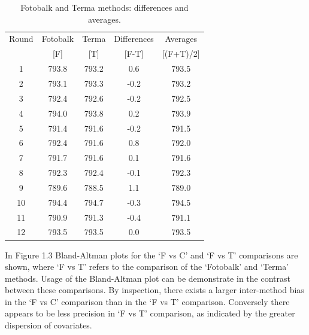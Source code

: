 \documentclass[Main.tex]{subfiles}
\begin{document}
\begin{table}[h!]
	\renewcommand\arraystretch{0.7}%
	\begin{center}
		\begin{tabular}{|c||c|c||c|c|}
			\hline
			Round & Fotobalk  & Terma  & Differences  & Averages  \\
			&  [F] & [T] & [F-T] &  [(F+T)/2] \\
			\hline
			1 & 793.8 & 793.2 & 0.6 & 793.5 \\
			2 & 793.1 & 793.3 & -0.2 & 793.2 \\
			3 & 792.4 & 792.6 & -0.2 & 792.5 \\
			4 & 794.0 & 793.8 & 0.2 & 793.9 \\
			5 & 791.4 & 791.6 & -0.2 & 791.5 \\
			6 & 792.4& 791.6 & 0.8 & 792.0 \\
			7 & 791.7 & 791.6 & 0.1 & 791.6 \\
			8 & 792.3 & 792.4 & -0.1 & 792.3 \\
			9 & 789.6 & 788.5 & 1.1 & 789.0 \\
			10 & 794.4 & 794.7 & -0.3 & 794.5 \\
			11 & 790.9 & 791.3 & -0.4 & 791.1 \\
			12 & 793.5 & 793.5 & 0.0 & 793.5 \\
			
			\hline
		\end{tabular}
		\caption{Fotobalk and Terma methods: differences and averages.}
	\end{center}
\end{table}

\newpage




In Figure 1.3 Bland-Altman plots for the `F vs C' and `F vs T'
comparisons are shown, where `F vs T' refers to the comparison of
the `Fotobalk' and `Terma' methods. Usage of the Bland-Altman plot
can be demonstrate in the contrast between these comparisons. By inspection, there exists a larger inter-method bias in the `F vs C' comparison than in the `F vs T' comparison. Conversely there
appears to be less precision in `F vs T' comparison, as indicated
by the greater dispersion of covariates.
\end{document}
